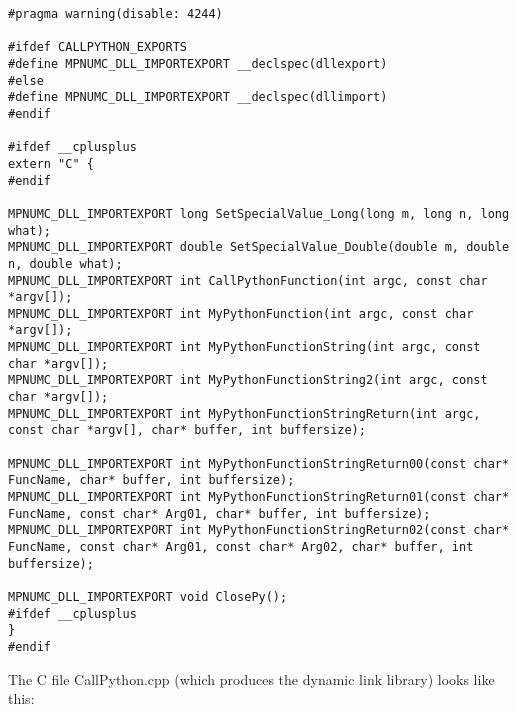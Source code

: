 \begin{lstlisting}
#pragma warning(disable: 4244)

#ifdef CALLPYTHON_EXPORTS
#define MPNUMC_DLL_IMPORTEXPORT __declspec(dllexport)
#else
#define MPNUMC_DLL_IMPORTEXPORT __declspec(dllimport)
#endif

#ifdef __cplusplus
extern "C" {
#endif

MPNUMC_DLL_IMPORTEXPORT long SetSpecialValue_Long(long m, long n, long what);
MPNUMC_DLL_IMPORTEXPORT double SetSpecialValue_Double(double m, double n, double what);
MPNUMC_DLL_IMPORTEXPORT int CallPythonFunction(int argc, const char *argv[]);
MPNUMC_DLL_IMPORTEXPORT int MyPythonFunction(int argc, const char *argv[]);
MPNUMC_DLL_IMPORTEXPORT int MyPythonFunctionString(int argc, const char *argv[]);
MPNUMC_DLL_IMPORTEXPORT int MyPythonFunctionString2(int argc, const char *argv[]);
MPNUMC_DLL_IMPORTEXPORT int MyPythonFunctionStringReturn(int argc, const char *argv[], char* buffer, int buffersize);

MPNUMC_DLL_IMPORTEXPORT int MyPythonFunctionStringReturn00(const char* FuncName, char* buffer, int buffersize);
MPNUMC_DLL_IMPORTEXPORT int MyPythonFunctionStringReturn01(const char* FuncName, const char* Arg01, char* buffer, int buffersize);
MPNUMC_DLL_IMPORTEXPORT int MyPythonFunctionStringReturn02(const char* FuncName, const char* Arg01, const char* Arg02, char* buffer, int buffersize);

MPNUMC_DLL_IMPORTEXPORT void ClosePy();
#ifdef __cplusplus
}
#endif
\end{lstlisting}


The C file CallPython.cpp (which produces the dynamic link library) looks like this:

